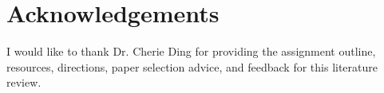 



\section*{Acknowledgements}

I would like to thank Dr. Cherie Ding for providing the assignment outline, resources, directions, paper selection advice, and feedback for this literature review.

